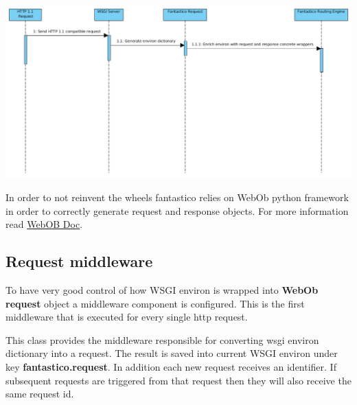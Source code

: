 \documentclass[letterpaper,10pt,english]{sphinxmanual}
\begin{document}
\includegraphics{request_response_sd.png}

In order to not reinvent the wheels fantastico relies on WebOb python framework in order to correctly generate request and
response objects. For more information read \href{http://docs.webob.org/en/latest/reference.html}{WebOB Doc}.


\subsection{Request middleware}
\label{features/request_response:request-middleware}
To have very good control of how WSGI environ is wrapped into \textbf{WebOb request} object a middleware component is configured. This
is the first middleware that is executed for every single http request.

\begin{fulllineitems}
\label{features/request_response:fantastico.middleware.request_middleware.RequestMiddleware}
This class provides the middleware responsible for converting wsgi environ dictionary into a request. The result is saved
into current WSGI environ under key \textbf{fantastico.request}. In addition each new request receives an identifier. If subsequent
requests are triggered from that request then they will also receive the same request id.

\end{fulllineitems}
\end{document}
